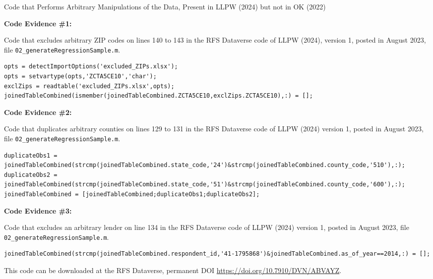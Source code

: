 \documentclass{article}
\begin{document}
\begin{table}

\caption{Code that Performs Arbitrary Manipulations of the Data, Present in LLPW (2024) but not in OK (2022)}

\bigskip

\textbf{Code Evidence \#1:}

\bigskip

Code that excludes arbitrary ZIP codes on lines 140 to 143 in the RFS Dataverse code of LLPW (2024), version 1,
posted in August 2023, file \texttt{02\_generateRegressionSample.m}.

{%
\begin{lstlisting}
opts = detectImportOptions('excluded_ZIPs.xlsx');                                      
opts = setvartype(opts,'ZCTA5CE10','char');                                            
exclZips = readtable('excluded_ZIPs.xlsx',opts);                                       
joinedTableCombined(ismember(joinedTableCombined.ZCTA5CE10,exclZips.ZCTA5CE10),:) = [];
\end{lstlisting}}

\bigskip

\textbf{Code Evidence \#2:}

\bigskip

Code that duplicates arbitrary counties on lines 129 to 131 in the RFS Dataverse code of LLPW (2024) version 1,
posted in August 2023, file \texttt{02\_generateRegressionSample.m}.

{\footnotesize
\begin{lstlisting}
duplicateObs1 = joinedTableCombined(strcmp(joinedTableCombined.state_code,'24')&strcmp(joinedTableCombined.county_code,'510'),:);
duplicateObs2 = joinedTableCombined(strcmp(joinedTableCombined.state_code,'51')&strcmp(joinedTableCombined.county_code,'600'),:);
joinedTableCombined = [joinedTableCombined;duplicateObs1;duplicateObs2];
\end{lstlisting}}

\bigskip

\textbf{Code Evidence \#3:}

\bigskip

Code that excludes an arbitrary lender on line 134 in the RFS Dataverse code of LLPW (2024) version 1,
posted in August 2023, file \texttt{02\_generateRegressionSample.m}.

{\footnotesize
\begin{lstlisting}
joinedTableCombined(strcmp(joinedTableCombined.respondent_id,'41-1795868')&joinedTableCombined.as_of_year==2014,:) = [];
\end{lstlisting}}

\bigskip

This code can be downloaded at the RFS Dataverse, permanent DOI \url{https://doi.org/10.7910/DVN/ABVAYZ}.

\end{table}
\end{document}
